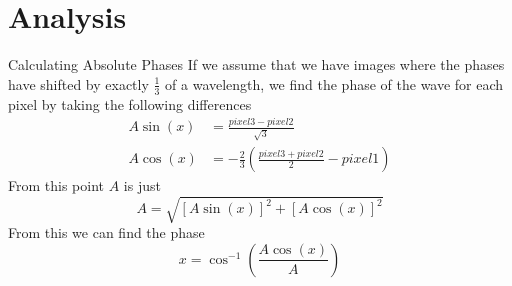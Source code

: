 \documentclass[pdf]{beamer}
\begin{document}
\section{Analysis}
\begin{frame}{Calculating Absolute Phases}
If we assume that we have images where the phases have shifted by exactly $\frac13$ of a wavelength, we find the phase of the wave for each pixel by taking the following differences
\begin{align*}
	A\sin(x) &= \frac{pixel3 - pixel2}{\sqrt 3}\\
	A\cos(x) &= -\frac23 \left(\frac{pixel3 + pixel2}{2} - pixel1\right)
\end{align*}
From this point $A$ is just
$$A = \sqrt{[A\sin(x)]^2 + [A\cos(x)]^2}$$
From this we can find the phase
$$x = \cos^{-1}\left(\frac{A\cos(x)}{A}\right)$$
\end{frame}
\end{document}
